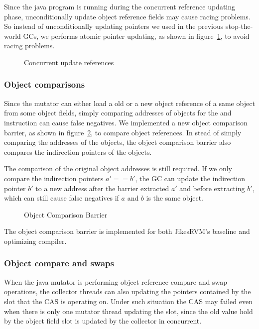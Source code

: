 Since the java program is running during the concurrent reference updating phase,
unconditionally update object reference fields may cause racing problems. So instead of
unconditionally updating pointers we used in the previous stop-the-world GCs, we performs
atomic pointer updating, as shown in figure~\ref{fig:concupdaterefs},
to avoid racing problems.

\begin{figure}
  \centering
  
  \caption{Concurrent update references}
  \label{fig:concupdaterefs}
\end{figure}

\subsubsection{Object comparisons}

Since the mutator can either load a old or a new object reference of a same object
from some object fields, simply comparing addresses of objects for the  and 
instruction can cause false negatives. We implemented a new object comparison barrier,
as shown in figure~\ref{fig:objectcomparisonbarrier}, to compare object references.
In stead of simply comparing the addresses of the objects, the object comparison barrier also
compares the indirection pointers of the objects.

The comparison of the original object addresses is still required. If we only compare the
indirection pointers $a' == b'$, the GC can update the indirection pointer $b'$ to a new
address after the barrier extracted $a'$ and before extracting $b'$, which can still cause false
negatives if $a$ and $b$ is the same object.

\begin{figure}
  \centering
  
  \caption{Object Comparison Barrier}
  \label{fig:objectcomparisonbarrier}
\end{figure}

The object comparison barrier is implemented for both JikesRVM's baseline and optimizing compiler.

\subsubsection{Object compare and swaps}

When the java mutator is performing object reference compare and swap operations,
the collector threads can also updating the pointers contained by the slot that the CAS
is operating on. Under such situation the CAS may failed even when there is only one mutator
thread updating the slot, since the old value hold by the object field slot is updated
by the collector in concurrent.


